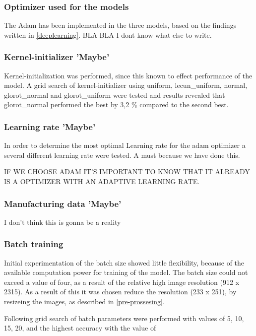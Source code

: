 \subsubsection{Optimizer used for the models}
The Adam has been implemented in the three models, based on the findings written in \autoref{deeplearning}. 
BLA BLA I dont know what else to write.  

\subsubsection{Kernel-initializer 'Maybe'}
Kernel-initialization was performed, since this known to effect performance of the model. 
A grid search of kernel-initializer using uniform, lecun_uniform, normal, glorot_normal and glorot_uniform were tested and results revealed that glorot_normal performed the best by 3,2 \% compared to the second best. 


\subsubsection{Learning rate 'Maybe'}
In order to determine the most optimal Learning rate for the adam optimizer a several different learning rate were tested. 
A must because we have done this. 

IF WE CHOOSE ADAM IT'S IMPORTANT TO KNOW THAT IT ALREADY IS A OPTIMIZER WITH AN ADAPTIVE LEARNING RATE. 


\subsubsection{Manufacturing data 'Maybe'}
I don't think this is gonna be a reality 


\subsubsection{Batch training}
Initial experimentation of the batch size showed little flexibility, because of the available computation power for training of the model. The batch size could not exceed a value of four, as a result of the relative high image resolution (912 x 2315). As a result of this it was chosen reduce the resolution (233 x 251), by resizeing the images, as described in \ref{pre-prossesing}. 

Following grid search of batch parameters were performed with values of 5, 10, 15, 20, and the highest accuracy with the value of

